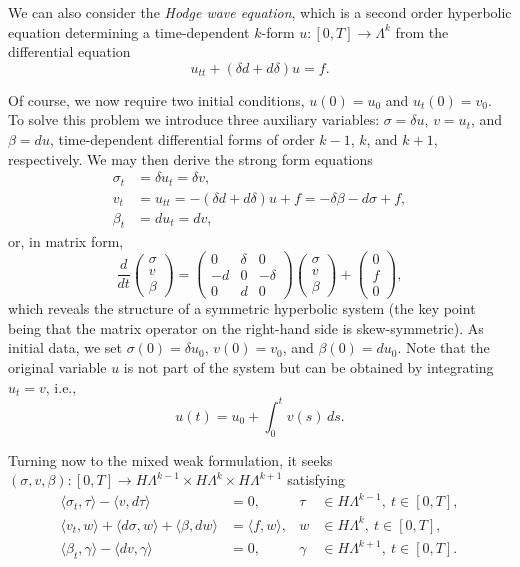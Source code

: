 {We can also consider the \emph{Hodge wave equation}, which is a second order hyperbolic equation determining a time-dependent $k$-form $u:[0,T]\to\Lambda^k$ from the differential equation}
\begin{equation}\label{eq:hodge-wave-equation}
u_{tt}+(\delta d+d\delta)u=f.
\end{equation}

{Of course, we now require two initial conditions, $u(0)=u_0$ and $u_t(0)=v_0$. To solve this problem we introduce three auxiliary variables: $\sigma=\delta u$, $v=u_t$, and $\beta=du$, time-dependent differential forms of order $k-1$, $k$, and $k+1$, respectively. We may then derive the strong form equations}
\[
\begin{aligned}
\sigma_t&=\delta u_t=\delta v,\\
v_t&=u_{tt}=-(\delta d+d\delta)u+f=-\delta\beta-d\sigma+f,\\
\beta_t&=du_t=dv,
\end{aligned}
\]
{or, in matrix form,}
\[
\frac d{dt}\begin{pmatrix}\sigma\\v\\\beta\end{pmatrix}=
\begin{pmatrix}0&\delta&0\\-d&0&-\delta\\0&d&0\end{pmatrix}
\begin{pmatrix}\sigma\\v\\\beta\end{pmatrix}+\begin{pmatrix}0\\f\\0\end{pmatrix},
\]
{which reveals the structure of a symmetric hyperbolic system (the key point being that the matrix operator on the right-hand side is skew-symmetric). As initial data, we set $\sigma(0)=\delta u_0$, $v(0)=v_0$, and $\beta(0)=du_0$. Note that the original variable $u$ is not part of the system but can be obtained by integrating $u_t=v$, i.e.,}
\[
u(t)=u_0+\int_0^t v(s)\,ds.
\]

{Turning now to the mixed weak formulation, it seeks $(\sigma,v,\beta):[0,T]\to H\Lambda^{k-1}\times H\Lambda^k\times H\Lambda^{k+1}$ satisfying}
\begin{equation}\label{eq:hodge-wave-weak-formulation}
\begin{aligned}
\langle\sigma_t,\tau\rangle-\langle v,d\tau\rangle&=0,&\tau&\in H\Lambda^{k-1},\ t\in[0,T],\\
\langle v_t,w\rangle+\langle d\sigma,w\rangle+\langle\beta,dw\rangle&=\langle f,w\rangle,&w&\in H\Lambda^k,\ t\in[0,T],\\
\langle\beta_t,\gamma\rangle-\langle dv,\gamma\rangle&=0,&\gamma&\in H\Lambda^{k+1},\ t\in[0,T].
\end{aligned}
\end{equation}

